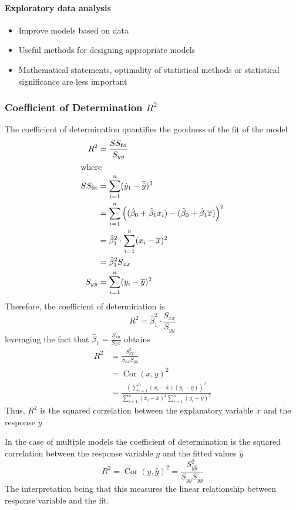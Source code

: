 \documentclass[11pt]{article}
\theoremstyle{definition}
\newcommand*\samplemean[1]{\overline{#1}}
\newcommand*\Cor[1]{\mathop{\text{Cor}}\left(#1\right)}
\begin{document}
\paragraph{Exploratory data analysis}
\begin{itemize}
	\item Improve models based on data
	\item Useful methods for designing appropriate models
	\item Mathematical statements, optimality of statistical methods or statistical significance are less important
\end{itemize}

\subsubsection{Coefficient of Determination $R^2$}
The coefficient of determination quantifies the goodness of the fit of the model
\begin{align*}
	R^2 &= \frac{SS_\text{fit}}{S_{yy}}\\
	\intertext{where}
	SS_\text{fit} &= \sum_{i=1}^{n} (\hat{y}_1 - \samplemean{\hat{y}})^2\\
	&= \sum_{i=1}^{n} \left( (\hat{\beta}_0 + \hat{\beta}_1 x_i) - (\hat{\beta}_0 + \hat{\beta}_1 \samplemean{x}) \right)^2\\
	&= \hat{\beta}_1^2 \cdot \sum_{i=1}^{n} (x_i - \samplemean{x})^2\\
	&= \hat{\beta}_1^2 S_{xx}\\
	S_{yy} &= \sum_{i=1}^{n} (y_i - \samplemean{y})^2
\end{align*}
Therefore, the coefficient of determination is
\begin{equation*}
	R^2 = \hat{\beta}_1^2\cdot\frac{S_{xx}}{S_{yy}}
\end{equation*}
leveraging the fact that $\hat{\beta}_1 = \frac{S_{xy}}{S_xx}$ obtains
\begin{align*}
	R^2 &= \frac{S_{xy}^2}{S_{xx}S_{yy}}\\
	&= \Cor{x,y}^2\\
	&= \frac{\left(\sum_{i=1}^{n} (x_i - \samplemean{x})(y_i - \samplemean{y}) \right)^2}{\sum_{i=1}^{n}(x_i - \samplemean{x})^2 \sum_{i=1}^{n}(y_i - \samplemean{y})^2}
\end{align*}
Thus, $R^2$ is the squared correlation between the explanatory variable $x$ and the response $y$.

In the case of multiple models the coefficient of determination is the squared correlation between the response variable $y$ and the fitted values $\hat{y}$
\begin{equation*}
	R^2 = \Cor{y,\hat{y}}^2 = \frac{S_{y\hat{y}}^2}{S_{yy}S_{\hat{y}\hat{y}}}
\end{equation*}
The interpretation being that this measures the linear relationship between response variable and the fit.
\end{document}
